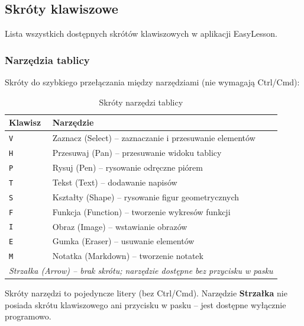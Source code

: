 \documentclass[12pt,a4paper]{article}
\begin{document}
\subsection{Skróty klawiszowe}

Lista wszystkich dostępnych skrótów klawiszowych w aplikacji EasyLesson.

\subsubsection{Narzędzia tablicy}

Skróty do szybkiego przełączania między narzędziami (nie wymagają Ctrl/Cmd):

\begin{table}[H]
\centering
\begin{tabular}{|l|l|}
\hline
\textbf{Klawisz} & \textbf{Narzędzie} \\
\hline
\texttt{V} & Zaznacz (Select) -- zaznaczanie i przesuwanie elementów \\
\hline
\texttt{H} & Przesuwaj (Pan) -- przesuwanie widoku tablicy \\
\hline
\texttt{P} & Rysuj (Pen) -- rysowanie odręczne piórem \\
\hline
\texttt{T} & Tekst (Text) -- dodawanie napisów \\
\hline
\texttt{S} & Kształty (Shape) -- rysowanie figur geometrycznych \\
\hline
\texttt{F} & Funkcja (Function) -- tworzenie wykresów funkcji \\
\hline
\texttt{I} & Obraz (Image) -- wstawianie obrazów \\
\hline
\texttt{E} & Gumka (Eraser) -- usuwanie elementów \\
\hline
\texttt{M} & Notatka (Markdown) -- tworzenie notatek \\
\hline
\multicolumn{2}{|l|}{\textit{Strzałka (Arrow) -- brak skrótu; narzędzie dostępne bez przycisku w pasku}} \\
\hline
\end{tabular}
\caption{Skróty narzędzi tablicy}
\label{tab:tool_shortcuts}
\end{table}

\begin{tcolorbox}[colback=green!5!white,colframe=green!75!black,title=\faLightbulb\ Wskazówka]
Skróty narzędzi to pojedyncze litery (bez Ctrl/Cmd). Narzędzie \textbf{Strzałka} nie posiada skrótu klawiszowego ani przycisku w pasku -- jest dostępne wyłącznie programowo.
\end{tcolorbox}
\end{document}

